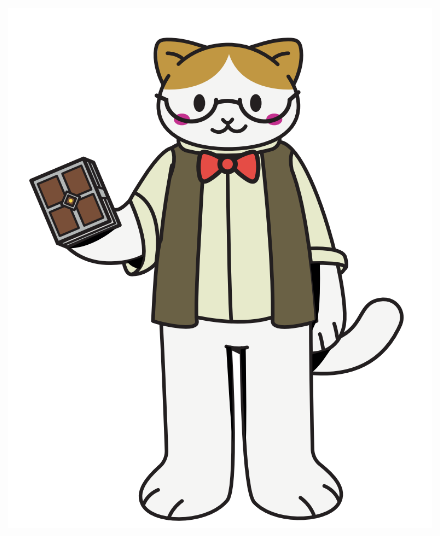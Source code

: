
\begin{figure}[h]
    \centerline{\includegraphics[scale=.33]{assets/01_gatito_introduccion.PNG}}       
\end{figure}



\bigskip

